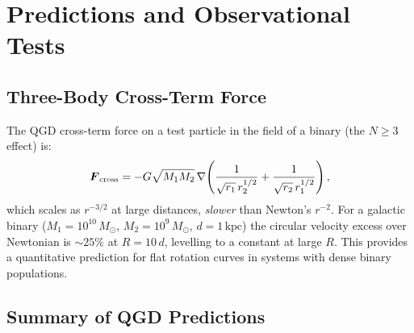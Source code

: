 \documentclass[11pt,a4paper]{article}
\newcommand{\Ms}{M_\odot}
\theoremstyle{definition}
\theoremstyle{remark}
\begin{document}
	\section{Predictions and Observational Tests}
	\label{sec:predictions}
	
	\subsection{Three-Body Cross-Term Force}
	
	The QGD cross-term force on a test particle in the field of a binary
	(the $N\geq3$ effect) is:
	\begin{equation}
		\boldsymbol{F}_{\rm cross}
		= -G\sqrt{M_1 M_2}\,\nabla\!
		\left(\frac{1}{\sqrt{r_1}\,r_2^{1/2}}
		+ \frac{1}{\sqrt{r_2}\,r_1^{1/2}}\right),
		\label{eq:cross_force}
	\end{equation}
	which scales as $r^{-3/2}$ at large distances, \emph{slower} than
	Newton's $r^{-2}$.  For a galactic binary ($M_1=10^{10}\,\Ms$,
	$M_2=10^9\,\Ms$, $d=1\,\mathrm{kpc}$) the circular velocity excess
	over Newtonian is $\sim25\%$ at $R=10\,d$, levelling to a constant
	at large $R$.  This provides a quantitative prediction for flat
	rotation curves in systems with dense binary populations.
	
	\subsection{Summary of QGD Predictions}
	
\end{document}
